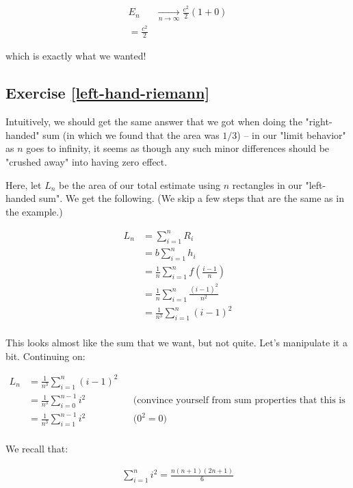 \documentclass{article}
\begin{document}
\begin{align*}
E_n &\xrightarrow[n \to \infty]{} \frac{c^2}{2} \left( 1 + 0 \right)  \\
= \frac{c^2}{2}
\end{align*}

which is exactly what we wanted!


\subsection{Exercise \ref{left-hand-riemann}}

Intuitively, we should get the same answer that we got when doing the "right-handed" sum (in which we found that the area was $1/3$) -- in our "limit behavior" as $n$ goes to infinity, it seems as though any such minor differences should be "crushed away" into having zero effect. 



Here, let $L_n$ be the area of our total estimate using $n$ rectangles in our "left-handed sum". We get the following. (We skip a few steps that are the same as in the example.)

\begin{align*}
L_n &= \sum_{i=1}^n R_i \\
&= b \sum_{i=1}^n h_i \\
&= \frac{1}{n} \sum_{i=1}^n f(\frac{i-1}{n}) \\
&= \frac{1}{n} \sum_{i=1}^n \frac{(i-1)^2}{n^2} \\
&= \frac{1}{n^3} \sum_{i=1}^n (i-1)^2 \\
\end{align*}

This looks almost like the sum that we want, but not quite. Let's manipulate it a bit. Continuing on: 


\begin{align*}
L_n &= \frac{1}{n^3} \sum_{i=1}^n (i-1)^2 \\
&= \frac{1}{n^3} \sum_{i=0}^{n-1} i^2 && \text{(convince yourself from sum properties that this is true)} \\
&= \frac{1}{n^3} \sum_{i=1}^{n-1} i^2 && \text{($0^2 = 0$)} \\
\end{align*}

We recall that:

\begin{align*}
\sum_{i=1}^n i^2 = \frac{n(n+1)(2n+1)}{6}
\end{align*}
\end{document}
